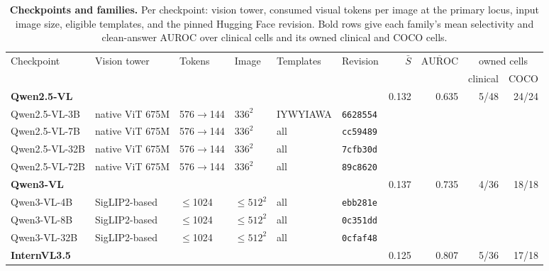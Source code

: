 \begin{table}[h]
\centering
\scriptsize
\setlength{\tabcolsep}{3pt}

\caption{\textbf{Checkpoints and families.} Per checkpoint: vision tower, consumed visual tokens per image at the primary locus, input image size, eligible templates, and the pinned Hugging Face revision. Bold rows give each family's mean selectivity and clean-answer AUROC over clinical cells and its owned clinical and COCO cells.}
\label{tab:cf-models}
\begin{tabular}{llllll@{\hspace{8pt}}rrrr}
\toprule
\multirow{2}{*}{Checkpoint} & \multirow{2}{*}{Vision tower} & \multirow{2}{*}{Tokens} & \multirow{2}{*}{Image} & \multirow{2}{*}{Templates} & \multirow{2}{*}{Revision} & \multirow{2}{*}{$\bar S$} & \multirow{2}{*}{$\overline{\mathrm{AUROC}}$} & \multicolumn{2}{c}{owned cells}\\
\cmidrule(lr){9-10}
&  &  &  &  &  &  &  & \multicolumn{1}{c}{clinical} & \multicolumn{1}{c}{COCO}\\
\midrule
\multicolumn{6}{l}{\textbf{Qwen2.5-VL}~\citep{bai2025qwen25vl}} & 0.132 & 0.635 & \cellcolor{cfSlate2}5/48 & \cellcolor{cfSlate4}24/24 \\
\quad Qwen2.5-VL-3B & native ViT 675M & 576$\to$144 & $336^2$ & IYWYIAWA & \texttt{6628554} & & & & \\
\quad Qwen2.5-VL-7B & native ViT 675M & 576$\to$144 & $336^2$ & all & \texttt{cc59489} & & & & \\
\quad Qwen2.5-VL-32B & native ViT 675M & 576$\to$144 & $336^2$ & all & \texttt{7cfb30d} & & & & \\
\quad Qwen2.5-VL-72B & native ViT 675M & 576$\to$144 & $336^2$ & all & \texttt{89c8620} & & & & \\
\midrule
\multicolumn{6}{l}{\textbf{Qwen3-VL}~\citep{qwen2025qwen3vl}} & 0.137 & 0.735 & \cellcolor{cfSlate2}4/36 & \cellcolor{cfSlate4}18/18 \\
\quad Qwen3-VL-4B & SigLIP2-based & $\leq$1024 & $\leq 512^2$ & all & \texttt{ebb281e} & & & & \\
\quad Qwen3-VL-8B & SigLIP2-based & $\leq$1024 & $\leq 512^2$ & all & \texttt{0c351dd} & & & & \\
\quad Qwen3-VL-32B & SigLIP2-based & $\leq$1024 & $\leq 512^2$ & all & \texttt{0cfaf48} & & & & \\
\midrule
\multicolumn{6}{l}{\textbf{InternVL3.5}~\citep{wang2025internvl35}} & 0.125 & 0.807 & \cellcolor{cfSlate2}5/36 & \cellcolor{cfSlate4}17/18 \\

\end{tabular}
\end{table}
